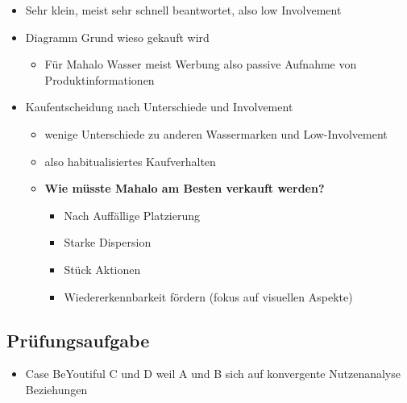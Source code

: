 \documentclass[a4paper]{article}
\begin{document}
\begin{enumerate}
\begin{itemize}
        \item Sehr klein, meist sehr schnell beantwortet, also low Involvement
        \item Diagramm Grund wieso gekauft wird
        \begin{itemize}
            \item Für Mahalo Wasser meist Werbung also passive Aufnahme von Produktinformationen
        \end{itemize}
        \item Kaufentscheidung nach Unterschiede und Involvement
        \begin{itemize}
            \item wenige Unterschiede zu anderen Wassermarken und Low-Involvement
            \item also habitualisiertes Kaufverhalten
            \item \textbf{Wie müsste Mahalo am Besten verkauft werden? }
            \begin{itemize}
                \item Nach Auffällige Platzierung
                \item Starke Dispersion 
                \item Stück Aktionen
                \item Wiedererkennbarkeit fördern (fokus auf visuellen Aspekte)
            \end{itemize}
        \end{itemize}
    \end{itemize}
\end{enumerate}

\subsection{Prüfungsaufgabe}
\begin{itemize}
    \item Case BeYoutiful
    \subitem C und D weil A und B sich auf konvergente Nutzenanalyse Beziehungen
\end{itemize}
\end{document}
